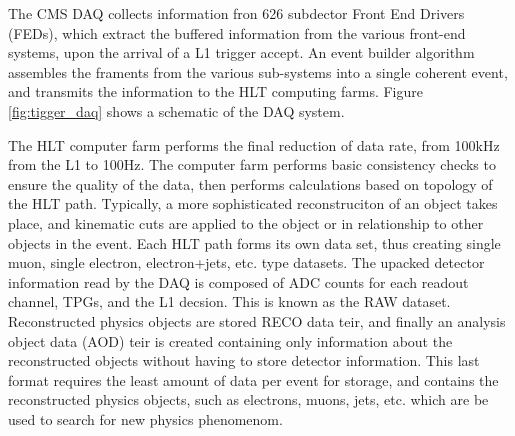 \par The CMS DAQ collects information fron 626 subdector Front End
Drivers (FEDs), which extract the buffered information from the
various front-end systems, upon the arrival of a L1 trigger accept.
An event builder algorithm assembles the framents from the various
sub-systems into a single coherent event, and transmits the
information to the HLT computing farms.  Figure \ref{fig:tigger_daq}
shows a schematic of the DAQ system.  

\par  The HLT computer farm performs the final reduction of data rate,
from 100kHz from the L1 to 100Hz.  The computer farm performs basic
consistency checks to ensure the quality of the data, then performs
calculations based on topology of the HLT path.  Typically, a more
sophisticated reconstruciton of an object takes place, and kinematic
cuts are applied to the object or in relationship to other objects in
the event.  Each HLT path forms its own data set, thus creating single
muon, single electron, electron+jets, etc. type datasets.  The upacked
detector information read by the DAQ is composed of ADC counts for
each readout channel, TPGs, and the L1 decsion.  This is known as the
RAW dataset.  Reconstructed physics objects are stored RECO data teir,
and finally an analysis object data (AOD) teir is created containing
only information about the reconstructed objects without having to
store detector information.  This last format requires the least
amount of data per event for storage, and contains the reconstructed
physics objects, such as electrons, muons, jets, etc. which are be
used to search for new physics phenomenom.  